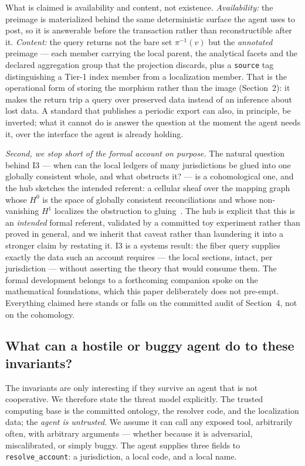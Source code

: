 \documentclass[11pt]{clapps}  %
\begin{document}
What is claimed is availability and content, not existence. \emph{Availability:}
the preimage is materialized behind the same deterministic surface the agent
uses to post, so it is answerable before the transaction rather than
reconstructible after it. \emph{Content:} the query returns not the bare set
$\pi^{-1}(v)$ but the \emph{annotated} preimage --- each member carrying the
local parent, the analytical facets and the declared aggregation group that the
projection discards, plus a \texttt{source} tag distinguishing a Tier-1 index
member from a localization member. That is the operational form of storing the
morphism rather than the image (Section~2): it makes the return trip a query
over preserved data instead of an inference about lost data. A standard that
publishes a periodic export can also, in principle, be inverted; what it cannot
do is answer the question at the moment the agent needs it, over the interface
the agent is already holding.

\emph{Second, we stop short of the formal account on purpose.} The natural
question behind I3 --- when can the local ledgers of many jurisdictions be glued
into one globally consistent whole, and what obstructs it? --- is a
cohomological one, and the hub sketches the intended referent: a cellular sheaf
over the mapping graph whose $H^{0}$ is the space of globally consistent
reconciliations and whose non-vanishing $H^{1}$ localizes the obstruction to
gluing~\cite{kontablo_hub}. The hub is explicit that this is an \emph{intended}
formal referent, validated by a committed toy experiment rather than proved in
general, and we inherit that caveat rather than laundering it into a stronger
claim by restating it. I3 is a systems result: the fiber query supplies exactly
the data such an account requires --- the local sections, intact, per
jurisdiction --- without asserting the theory that would consume them. The
formal development belongs to a forthcoming companion spoke on the mathematical
foundations, which this paper deliberately does not pre-empt. Everything claimed
here stands or falls on the committed audit of Section~4, not on the cohomology.



\subsection{What can a hostile or buggy agent do to these invariants?}
\label{sec:threat}

The invariants are only interesting if they survive an agent that is not
cooperative. We therefore state the threat model explicitly. The trusted
computing base is the committed ontology, the resolver code, and the
localization data; the \emph{agent is untrusted}. We assume it can call any
exposed tool, arbitrarily often, with arbitrary arguments --- whether because it
is adversarial, miscalibrated, or simply buggy. The agent supplies three fields
to \texttt{resolve\_account}: a jurisdiction, a local code, and a local name.
\end{document}
